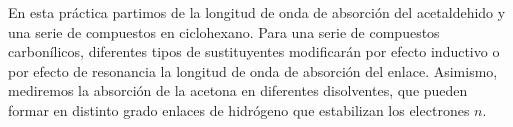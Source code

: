 \documentclass{tufte-book}
\begin{document}
En esta práctica partimos de la longitud de onda de absorción
del acetaldehido y una serie de compuestos en ciclohexano. 
Para una serie de compuestos carbonílicos, 
diferentes tipos de sustituyentes modificarán por efecto 
inductivo o por efecto de resonancia la longitud de onda
de absorción del enlace. Asimismo, mediremos la absorción
de la acetona en diferentes disolventes, que pueden formar 
en distinto grado enlaces de hidrógeno que estabilizan los 
electrones 
$n$.
%
%
\end{document}
